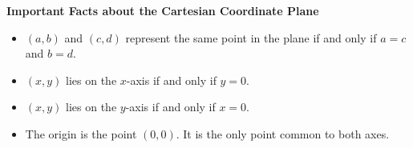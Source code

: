 \documentclass{ximera}
\begin{document}
\colorbox{ResultColor}{\bbm


\centerline{\textbf{Important Facts about the Cartesian Coordinate Plane}}

\begin{itemize}

\item $(a,b)$ and $(c,d)$ represent the same point in the plane if and only if $a = c$ and $b = d$.

\item  $(x,y)$ lies on the $x$-axis if and only if $y = 0$.

\item  $(x,y)$ lies on the $y$-axis if and only if $x=0$.

\item The origin is the point $(0,0)$.  It is the only point common to both axes.


\end{itemize}

\ebm}

\pagebreak
\end{document}
